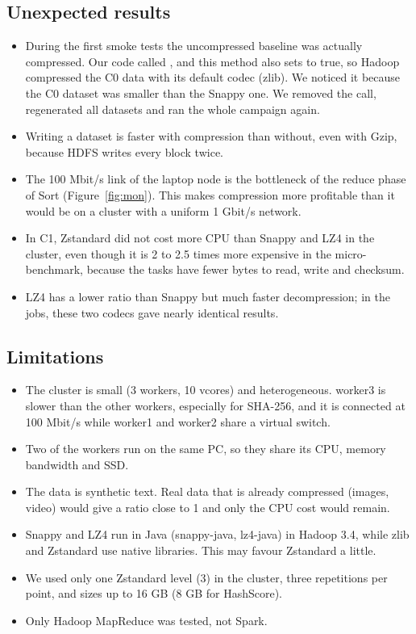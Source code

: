 \documentclass[11pt,a4paper]{article}
\begin{document}
\subsection{Unexpected results}
\begin{itemize}
  \item During the first smoke tests the uncompressed baseline was actually compressed. Our code called , and this method also sets  to true, so Hadoop compressed the C0 data with its default codec (zlib). We noticed it because the C0 dataset was smaller than the Snappy one. We removed the call, regenerated all datasets and ran the whole campaign again.
  \item Writing a dataset is faster with compression than without, even with Gzip, because HDFS writes every block twice.
  \item The 100 Mbit/s link of the laptop node is the bottleneck of the reduce phase of Sort (Figure~\ref{fig:mon}). This makes compression more profitable than it would be on a cluster with a uniform 1 Gbit/s network.
  \item In C1, Zstandard did not cost more CPU than Snappy and LZ4 in the cluster, even though it is 2 to 2.5 times more expensive in the micro-benchmark, because the tasks have fewer bytes to read, write and checksum.
  \item LZ4 has a lower ratio than Snappy but much faster decompression; in the jobs, these two codecs gave nearly identical results.
\end{itemize}

\subsection{Limitations}
\begin{itemize}
  \item The cluster is small (3 workers, 10 vcores) and heterogeneous. worker3 is slower than the other workers, especially for SHA-256, and it is connected at 100 Mbit/s while worker1 and worker2 share a virtual switch.
  \item Two of the workers run on the same PC, so they share its CPU, memory bandwidth and SSD.
  \item The data is synthetic text. Real data that is already compressed (images, video) would give a ratio close to 1 and only the CPU cost would remain.
  \item Snappy and LZ4 run in Java (snappy-java, lz4-java) in Hadoop 3.4, while zlib and Zstandard use native libraries. This may favour Zstandard a little.
  \item We used only one Zstandard level (3) in the cluster, three repetitions per point, and sizes up to 16 GB (8 GB for HashScore).
  \item Only Hadoop MapReduce was tested, not Spark.
\end{itemize}
\end{document}
